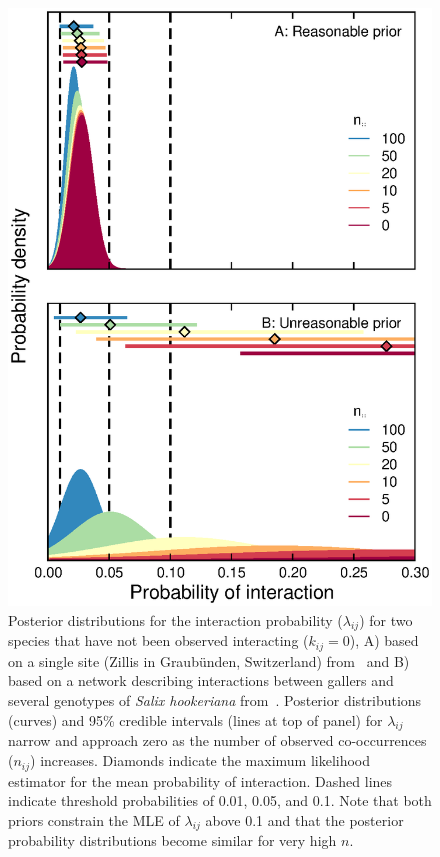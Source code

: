 \documentclass[12pt]{article}
\begin{document}
  \begin{figure}[h!]
    \caption{Posterior distributions for the interaction probability ($\lambda_{ij}$) for two species that have not been observed interacting ($k_{ij}=0$), A) based on a single site (Zillis in Graub\"{u}nden, Switzerland) from~\citet{Kopelke2017} and B) based on a network describing interactions between gallers and several genotypes of \emph{Salix hookeriana} from~\citet{Barbour2016}. Posterior distributions (curves) and 95\% credible intervals (lines at top of panel) for $\lambda_{ij}$ narrow and approach zero as the number of observed co-occurrences ($n_{ij}$) increases. Diamonds indicate the maximum likelihood estimator for the mean probability of interaction.
    Dashed lines indicate threshold probabilities of 0.01, 0.05, and 0.1. Note that both priors constrain the MLE of $\lambda_{ij}$ above 0.1 and that the posterior probability distributions become similar for very high $n$.}
    \label{prior_comparison}
    \begin{center}
    \includegraphics*[width=.8\textwidth]{Figure_4.eps}
    \end{center}
    \end{figure}




\clearpage

     
\end{document}

